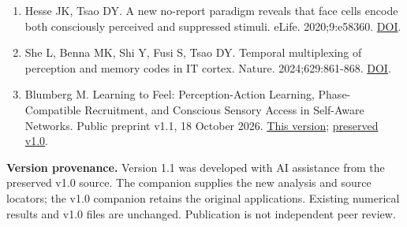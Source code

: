 \documentclass[
  american,
  11pt,
  letterpaper,
]{article}
\begin{document}
\begin{enumerate}
\item
  Hesse JK, Tsao DY. A new no-report paradigm reveals that face cells encode both consciously perceived and suppressed stimuli. eLife. 2020;9:e58360. \href{https://doi.org/10.7554/eLife.58360}{DOI}.
\item
  She L, Benna MK, Shi Y, Fusi S, Tsao DY. Temporal multiplexing of perception and memory codes in IT cortex. Nature. 2024;629:861-868. \href{https://doi.org/10.1038/s41586-024-07349-5}{DOI}.
\item
  Blumberg M. Learning to Feel: Perception-Action Learning, Phase-Compatible Recruitment, and Conscious Sensory Access in Self-Aware Networks. Public preprint v1.1, 18 October 2026. \href{https://doi.org/10.5281/zenodo.23455801}{This version}; \href{https://doi.org/10.5281/zenodo.23447925}{preserved v1.0}.
\end{enumerate}

\begingroup\small\par\smallskip\noindent\textbf{Version provenance.}\label{successor-provenance} Version 1.1 was developed with AI assistance from the preserved v1.0 source. The companion supplies the new analysis and source locators; the v1.0 companion retains the original applications. Existing numerical results and v1.0 files are unchanged. Publication is not independent peer review.

\endgroup
\end{document}
